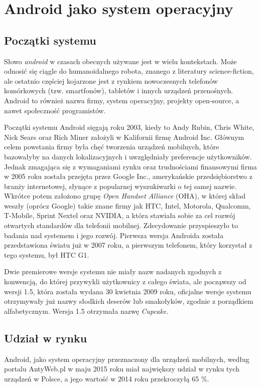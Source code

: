 \chapter{Android jako system operacyjny}

\section{Początki systemu}
Słowo \textit{android} w czasach obecnych używane jest w wielu kontekstach. Może odnosić się ciągle do humanoidalnego robota, znanego z literatury science-fiction, ale ostatnio częściej kojarzone jest z rynkiem nowoczesnych telefonów komórkowych (tzw. smartfonów), tabletów i innych urządzeń przenośnych. Android to również nazwa firmy, system operacyjny, projekty open-source, a nawet społeczność programistów.

Początki systemu Android sięgają roku 2003, kiedy to Andy Rubin, Chris White, Nick Sears oraz Rich Miner założyli w Kalifornii firmę Android Inc. Głównym celem powstania firmy była chęć tworzenia urządzeń mobilnych, które bazowałyby na danych lokalizacyjnych i uwzględniały preferencje użytkowników. Jednak zmagająca się z wymaganiami rynku oraz trudnościami finansowymi firma w 2005 roku została przejęta przez Google Inc., amerykańskie przedsiębiorstwo z branży internetowej, słynące z popularnej wyszukiwarki o tej samej nazwie. Wkrótce potem założono grupę \textit{Open Handset Alliance} (OHA), w której skład weszły (oprócz Google) takie znane firmy jak HTC, Intel, Motorola, Qualcomm, T-Mobile, Sprint Nextel oraz NVIDIA, a która stawiała sobie za cel rozwój otwartych standardów dla telefonii mobilnej. Zdecydowanie przyspieszyło to badania nad systemem i jego rozwój. Pierwsza wersja Androida została przedstawiona światu już w 2007 roku, a pierwszym telefonem, który korzystał z tego systemu, był HTC G1.

Dwie premierowe wersje systemu nie miały nazw nadanych zgodnych z konwencją, do której przywykli użytkownicy z całego świata, ale począwszy od wersji 1.5, która została wydana 30 kwietnia 2009 roku, oficjalne wersje systemu otrzymywały już nazwy słodkich deserów lub smakołyków, zgodnie z porządkiem alfabetycznym. Wersja 1.5 otrzymała nazwę \textit{Cupcake}.

\section{Udział w rynku}
Android, jako system operacyjny przeznaczony dla urządzeń mobilnych, według portalu AntyWeb.pl w maju 2015 roku miał największy udział w rynku tych urządzeń w Polsce, a jego wartość w 2014 roku przekroczyłą 65 \%. 

